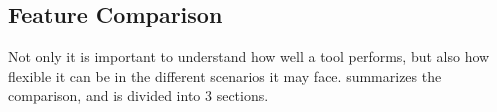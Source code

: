 \subsection{Feature Comparison}\label{section:feat_comp}

Not only it is important to understand how well a tool performs, but also how flexible it can be in the different scenarios it may face.  summarizes the comparison, and is divided into 3 sections. %





